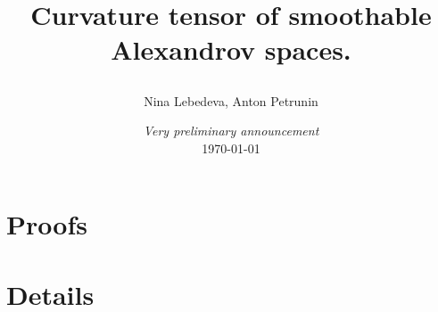 \documentclass[a4paper,10pt]{article}
\begin{document}
\title{Curvature tensor of smoothable Alexandrov spaces. 
\date{{\it Very preliminary announcement} \\ \today}
}
\author{Nina Lebedeva, Anton Petrunin} 
\maketitle



\tableofcontents




\part{Proofs}











%

%
%
%

\part{Details}



%

{\sloppy
\printbibliography[heading=bibintoc]
\fussy
}
\end{document}
